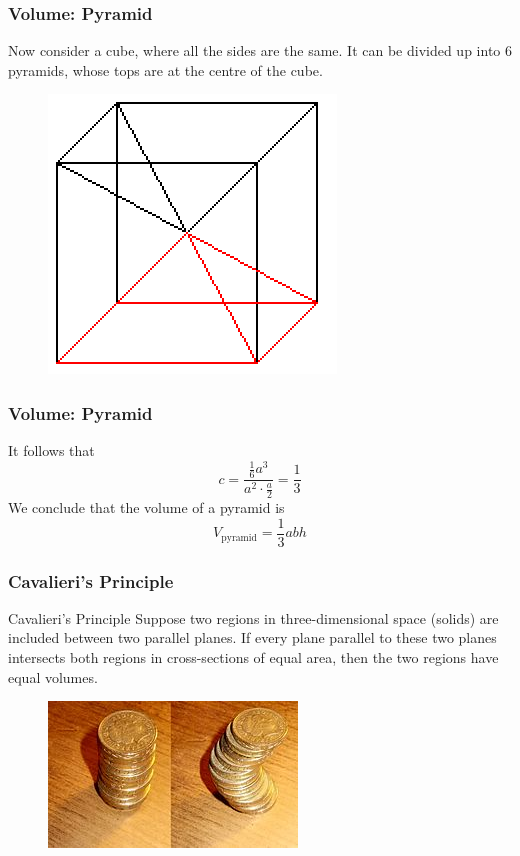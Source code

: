 \documentclass[xcolor=dvipsnames]{beamer}
\begin{document}
\begin{frame}
  \frametitle{Volume: Pyramid}
Now consider a cube, where all the sides are the same. It can be
divided up into 6 pyramids, whose tops are at the centre of the cube.
  \begin{figure}[h]
    \includegraphics[scale=.5]{./pyramid08.png}
  \end{figure}
\end{frame}

\begin{frame}
  \frametitle{Volume: Pyramid}
  It follows that
  \begin{equation}
    \label{eq:jeisaure}
    c=\frac{\frac{1}{6}a^{3}}{a^{2}\cdot{}\frac{a}{2}}=\frac{1}{3}
  \end{equation}
  We conclude that the volume of a pyramid is
  \begin{equation}
    \label{eq:authaque}
  V_{\mbox{pyramid}}=\frac{1}{3}abh
  \end{equation}
\end{frame}

\begin{frame}
  \frametitle{Cavalieri's Principle}
  \begin{block}{Cavalieri's Principle}
    Suppose two regions in three-dimensional space (solids) are
    included between two parallel planes. If every plane parallel to
    these two planes intersects both regions in cross-sections of
    equal area, then the two regions have equal volumes.
  \end{block}
  \begin{figure}[h]
    \includegraphics[scale=2]{./cavalieri.jpg}
  \end{figure}
\end{frame}
\end{document}
